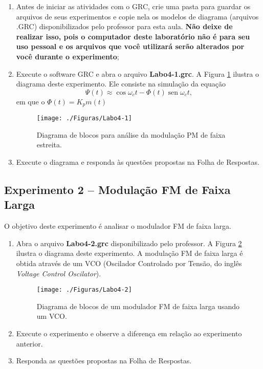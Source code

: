 \documentclass[12pt,addpoints]{exam}
\begin{document}
\begin{enumerate}
    \item Antes de iniciar as atividades com o GRC, crie uma pasta para guardar os arquivos de seus experimentos e copie nela os modelos de diagrama (arquivos .GRC) disponibilizados pelo professor para esta aula. \textbf{Não deixe de realizar isso, pois o computador deste laboratório não é para seu uso pessoal e os arquivos que você utilizará serão alterados por você durante o experimento};
    \item Execute o software GRC e abra o arquivo \textbf{Labo4-1.grc}. A Figura \ref{fig:GRC_4-1} ilustra o diagrama deste experimento. Ele consiste na simulação da equação 
\begin{equation}
    \varPsi(t) \approx \cos\omega_ct - \Phi(t)\operatorname{sen}{\omega_{c}t}, \label{eq:pmnb}
\end{equation}
em que o $\Phi(t) = K_pm(t)$
    \begin{figure}[htb]
        \centering
        \texttt{[image: ./Figuras/Labo4-1]}
        \caption{Diagrama de blocos para análise da modulação PM de faixa estreita.} 
        \label{fig:GRC_4-1}
    \end{figure}
  \item Execute o diagrama e responda às questões propostas na Folha de Respostas.
\end{enumerate}

\subsection{Experimento 2 -- Modulação FM de Faixa Larga}

O objetivo deste experimento é analisar o modulador FM de faixa larga. 

\begin{enumerate}
    \item Abra o arquivo \textbf{Labo4-2.grc} disponibilizado pelo professor. A Figura \ref{fig:GRC_4-2} ilustra o diagrama deste experimento. A modulação FM de faixa larga é obtida através de um VCO (Oscilador Controlado por Tensão, do inglês {\it Voltage Control Oscilator}).
    \begin{figure}[htb]
        \centering
        \texttt{[image: ./Figuras/Labo4-2]}
        \caption{Diagrama de blocos de um modulador FM de faixa larga usando um VCO.}
        \label{fig:GRC_4-2}
    \end{figure}
  \item Execute o experimento e observe a diferença em relação ao experimento anterior.
  \item Responda as questões propostas na Folha de Respostas.
\end{enumerate}
\end{document}
